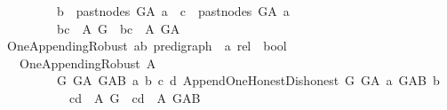 \begin{isabellebody}
\ \ \ \ \ \ \ \ {\isasymor}\ {\isacharparenleft}{\kern0pt}b\ {\isasymnotin}\ past{\isacharunderscore}{\kern0pt}nodes\ G{\isacharunderscore}{\kern0pt}A\ a\ {\isasymand}\ c\ {\isasymnotin}\ past{\isacharunderscore}{\kern0pt}nodes\ G{\isacharunderscore}{\kern0pt}A\ a{\isacharparenright}{\kern0pt}{\isacharparenright}{\kern0pt}{\isacharparenright}{\kern0pt}\isanewline
\ \ \ \ \ \ \ \ {\isasymlongrightarrow}\ {\isacharparenleft}{\kern0pt}{\isacharparenleft}{\kern0pt}b{\isacharcomma}{\kern0pt}c{\isacharparenright}{\kern0pt}\ {\isasymin}\ {\isacharparenleft}{\kern0pt}A\ G{\isacharparenright}{\kern0pt}\ {\isasymlongrightarrow}\ {\isacharparenleft}{\kern0pt}b{\isacharcomma}{\kern0pt}c{\isacharparenright}{\kern0pt}\ {\isasymin}\ {\isacharparenleft}{\kern0pt}A\ G{\isacharunderscore}{\kern0pt}A{\isacharparenright}{\kern0pt}{\isacharparenright}{\kern0pt}{\isacharparenright}{\kern0pt}{\isachardoublequoteclose}\isanewline
\isanewline
\isanewline
{}\isamarkupfalse%
\ One{\isacharunderscore}{\kern0pt}Appending{\isacharunderscore}{\kern0pt}Robust{\isacharcolon}{\kern0pt}{\isacharcolon}{\kern0pt}\ {\isachardoublequoteopen}{\isacharparenleft}{\kern0pt}{\isacharparenleft}{\kern0pt}{\isacharprime}{\kern0pt}a{\isacharcomma}{\kern0pt}{\isacharprime}{\kern0pt}b{\isacharparenright}{\kern0pt}\ pre{\isacharunderscore}{\kern0pt}digraph\ {\isasymRightarrow}\ {\isacharprime}{\kern0pt}a\ rel{\isacharparenright}{\kern0pt}\ {\isasymRightarrow}\ bool\ {\isachardoublequoteclose}\isanewline
\ \ \ {\isachardoublequoteopen}One{\isacharunderscore}{\kern0pt}Appending{\isacharunderscore}{\kern0pt}Robust\ A\ {\isasymequiv}\isanewline
\ \ \ \ \ \ \ \ \ {\isacharparenleft}{\kern0pt}{\isasymforall}G\ G{\isacharunderscore}{\kern0pt}A\ G{\isacharunderscore}{\kern0pt}AB\ a\ b\ c\ d{\isachardot}{\kern0pt}\ Append{\isacharunderscore}{\kern0pt}One{\isacharunderscore}{\kern0pt}Honest{\isacharunderscore}{\kern0pt}Dishonest\ G\ G{\isacharunderscore}{\kern0pt}A\ a\ G{\isacharunderscore}{\kern0pt}AB\ b\isanewline
\ \ \ \ \ \ \ \ \ \ {\isasymlongrightarrow}\ {\isacharparenleft}{\kern0pt}{\isacharparenleft}{\kern0pt}c{\isacharcomma}{\kern0pt}d{\isacharparenright}{\kern0pt}\ {\isasymin}\ {\isacharparenleft}{\kern0pt}A\ G{\isacharparenright}{\kern0pt}\ {\isasymlongrightarrow}\ {\isacharparenleft}{\kern0pt}c{\isacharcomma}{\kern0pt}d{\isacharparenright}{\kern0pt}\ {\isasymin}\ {\isacharparenleft}{\kern0pt}A\ G{\isacharunderscore}{\kern0pt}AB{\isacharparenright}{\kern0pt}{\isacharparenright}{\kern0pt}{\isacharparenright}{\kern0pt}{\isachardoublequoteclose}\isanewline
%
\isadelimtheory
%
\endisadelimtheory
%
\isatagtheory
{}\isamarkupfalse%
%
\endisatagtheory
{\isafoldtheory}%
%
\isadelimtheory
%
\endisadelimtheory
%
\end{isabellebody}%
\endinput
